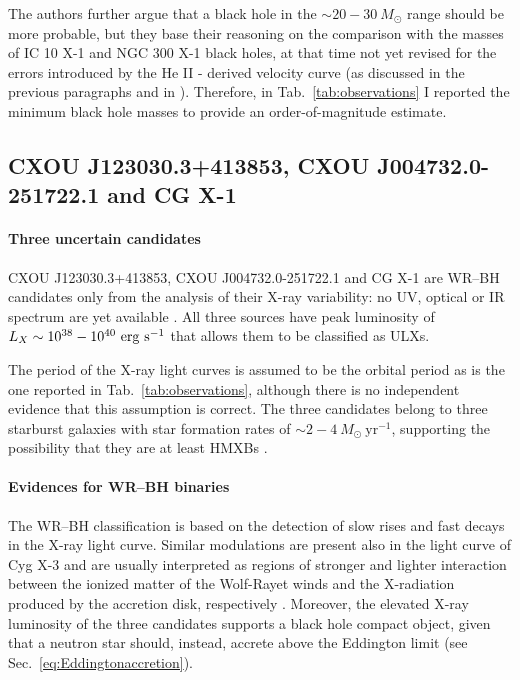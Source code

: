 \documentclass[a4paper,titlepage]{book}     	%
\newcommand{\sun}{\ensuremath{_\odot}}
\newcommand{\msun}{\ensuremath{M\sun}}
\newcommand{\yr}{\text{yr}}
\begin{document}
The authors further argue that a black hole in the $\sim 20-30~\msun$ range should be more probable, but they base their reasoning on the comparison with the masses of IC 10 X-1 and NGC 300 X-1 black holes, at that time not yet revised for the errors introduced by the He II - derived velocity curve (as discussed in the previous paragraphs and in \cite{ICX10X-1_Laycock2015_revisited,NGC300X-1_Binder2021_BHpreciso}). Therefore, in Tab.\ \ref{tab:observations} I reported the minimum black hole masses to provide an order-of-magnitude estimate.



\subsection{CXOU J123030.3+413853, CXOU J004732.0-251722.1 and CG X-1}\label{subsec:uncertainWRcandidates}

\paragraph{Three uncertain candidates} CXOU J123030.3+413853, CXOU J004732.0-251722.1 and CG X-1 are WR--BH candidates only from the analysis of their X-ray variability: no UV, optical or IR spectrum are yet available \cite{observations}. All three sources have peak luminosity of $L_X \sim 10^{38}-10^{40}~\rm erg~s^{-1}$ that allows them to be classified as ULXs. 

The period of the X-ray light curves is assumed to be the orbital period as is the one reported in Tab.\ \ref{tab:observations}, although there is no independent evidence that this assumption is correct. The three candidates belong to three starburst galaxies with star formation rates of $\sim 2-4~\msun~\yr^{-1}$, supporting the possibility that they are at least HMXBs \cite{observationsZSFR_Mapelli2010a}.

\paragraph{Evidences for WR--BH binaries} The WR--BH classification is based on the detection of slow rises and fast decays in the X-ray light curve. Similar modulations are present also in the light curve of Cyg X-3 and are usually interpreted as regions of stronger and lighter interaction between the ionized matter of the Wolf-Rayet winds and the X-radiation produced by the accretion disk, respectively \cite{observations}. Moreover, the elevated X-ray luminosity of the three candidates supports a black hole compact object, given that a neutron star should, instead, accrete above the Eddington limit (see Sec.\ \ref{eq:Eddingtonaccretion}).
\end{document}
